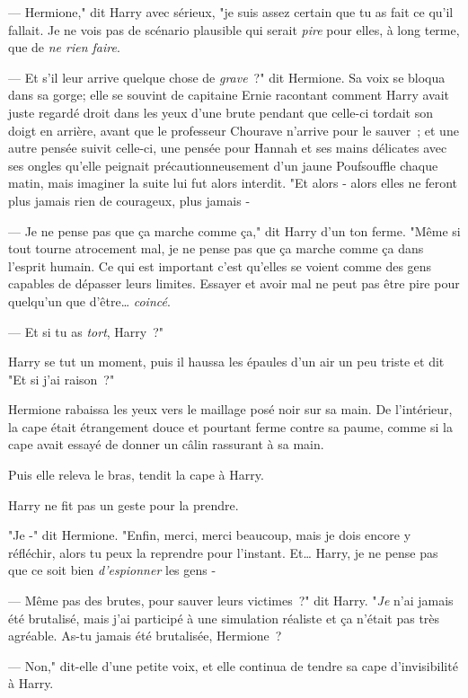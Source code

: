 --- Hermione," dit Harry avec sérieux, "je suis assez certain que tu as fait ce qu'il fallait. Je ne vois pas de scénario plausible qui serait \emph{pire} pour elles, à long terme, que de \emph{ne rien faire}.

--- Et s'il leur arrive quelque chose de \emph{grave}~?" dit Hermione. Sa voix se bloqua dans sa gorge; elle se souvint de capitaine Ernie racontant comment Harry avait juste regardé droit dans les yeux d'une brute pendant que celle-ci tordait son doigt en arrière, avant que le professeur Chourave n'arrive pour le sauver~; et une autre pensée suivit celle-ci, une pensée pour Hannah et ses mains délicates avec ses ongles qu'elle peignait précautionneusement d'un jaune Poufsouffle chaque matin, mais imaginer la suite lui fut alors interdit. "Et alors - alors elles ne feront plus jamais rien de courageux, plus jamais -

--- Je ne pense pas que ça marche comme ça," dit Harry d'un ton ferme. "Même si tout tourne atrocement mal, je ne pense pas que ça marche comme ça dans l'esprit humain. Ce qui est important c'est qu'elles se voient comme des gens capables de dépasser leurs limites. Essayer et avoir mal ne peut pas être pire pour quelqu'un que d'être… \emph{coincé}.

--- Et si tu as \emph{tort}, Harry~?"

Harry se tut un moment, puis il haussa les épaules d'un air un peu triste et dit "Et si j'ai raison~?"

Hermione rabaissa les yeux vers le maillage posé noir sur sa main. De l'intérieur, la cape était étrangement douce et pourtant ferme contre sa paume, comme si la cape avait essayé de donner un câlin rassurant à sa main.

Puis elle releva le bras, tendit la cape à Harry.

Harry ne fit pas un geste pour la prendre.

"Je -" dit Hermione. "Enfin, merci, merci beaucoup, mais je dois encore y réfléchir, alors tu peux la reprendre pour l'instant. Et… Harry, je ne pense pas que ce soit bien \emph{d'espionner} les gens -

--- Même pas des brutes, pour sauver leurs victimes~?" dit Harry. "\emph{Je} n'ai jamais été brutalisé, mais j'ai participé à une simulation réaliste et ça n'était pas très agréable. As-tu jamais été brutalisée, Hermione~?

--- Non," dit-elle d'une petite voix, et elle continua de tendre sa cape d'invisibilité à Harry.

